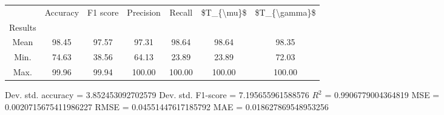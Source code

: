 \begin{tabular}{|c|c|c|c|c|c|c|}
\toprule
{} &  Accuracy &  F1 score &  Precision &  Recall &  \$T\_\{\textbackslash mu\}\$ &  \$T\_\{\textbackslash gamma\}\$ \\
Results &           &           &            &         &            &               \\
\hline
Mean    &     98.45 &     97.57 &      97.31 &   98.64 &      98.64 &         98.35 \\
Min.    &     74.63 &     38.56 &      64.13 &   23.89 &      23.89 &         72.03 \\
Max.    &     99.96 &     99.94 &     100.00 &  100.00 &     100.00 &        100.00 \\
\bottomrule
\end{tabular}

 Dev. std. accuracy = 3.852453092702579
 Dev. std. F1-score = 7.195655961588576
 $R^2$ = 0.9906779004364819
 MSE = 0.0020715675411986227
 RMSE = 0.04551447617185792
 MAE = 0.018627869548953256